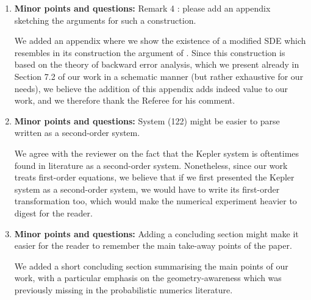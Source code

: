 \documentclass[10pt]{article}
\begin{document}
\begin{enumerate}
	\item 
	\begin{itquote}
		\textbf{Minor points and questions:} Remark 4 {\normalfont [Remark 5]}: please add an appendix sketching the arguments for such a construction.
	\end{itquote}
	We added an appendix where we show the existence of a modified SDE which resembles in its construction the argument of \cite[Section 2.4]{CGS17}. Since this construction is based on the theory of backward error analysis, which we present already in Section 7.2 of our work in a schematic manner (but rather exhaustive for our needs), we believe the addition of this appendix adds indeed value to our work, and we therefore thank the Referee for his comment.
	\item 
	\begin{itquote}
		\textbf{Minor points and questions:} System (122) might be easier to parse written as a second-order system.
	\end{itquote}
	We agree with the reviewer on the fact that the Kepler system is oftentimes found in literature as a second-order system. Nonetheless, since our work treats first-order equations, we believe that if we first presented the Kepler system as a second-order system, we would have to write its first-order transformation too, which would make the numerical experiment heavier to digest for the reader.  
	\item 
	\begin{itquote}
		\textbf{Minor points and questions:} Adding a concluding section might make it easier for the reader to remember the main take-away points of the paper.
	\end{itquote}
	We added a short concluding section summarising the main points of our work, with a particular emphasis on the geometry-awareness which was previously missing in the probabilistic numerics literature.
\end{enumerate}
\end{document}
